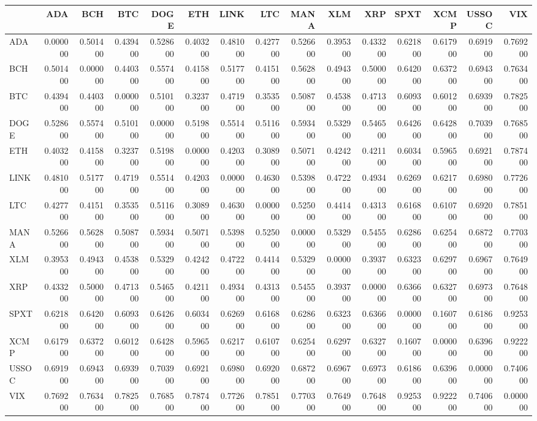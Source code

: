 \begin{tabular}{lrrrrrrrrrrrrrr}
\toprule
 & ADA & BCH & BTC & DOGE & ETH & LINK & LTC & MANA & XLM & XRP & SPXT & XCMP & USSOC & VIX \\
\midrule
ADA & 0.000000 & 0.501400 & 0.439400 & 0.528600 & 0.403200 & 0.481000 & 0.427700 & 0.526600 & 0.395300 & 0.433200 & 0.621800 & 0.617900 & 0.691900 & 0.769200 \\
BCH & 0.501400 & 0.000000 & 0.440300 & 0.557400 & 0.415800 & 0.517700 & 0.415100 & 0.562800 & 0.494300 & 0.500000 & 0.642000 & 0.637200 & 0.694300 & 0.763400 \\
BTC & 0.439400 & 0.440300 & 0.000000 & 0.510100 & 0.323700 & 0.471900 & 0.353500 & 0.508700 & 0.453800 & 0.471300 & 0.609300 & 0.601200 & 0.693900 & 0.782500 \\
DOGE & 0.528600 & 0.557400 & 0.510100 & 0.000000 & 0.519800 & 0.551400 & 0.511600 & 0.593400 & 0.532900 & 0.546500 & 0.642600 & 0.642800 & 0.703900 & 0.768500 \\
ETH & 0.403200 & 0.415800 & 0.323700 & 0.519800 & 0.000000 & 0.420300 & 0.308900 & 0.507100 & 0.424200 & 0.421100 & 0.603400 & 0.596500 & 0.692100 & 0.787400 \\
LINK & 0.481000 & 0.517700 & 0.471900 & 0.551400 & 0.420300 & 0.000000 & 0.463000 & 0.539800 & 0.472200 & 0.493400 & 0.626900 & 0.621700 & 0.698000 & 0.772600 \\
LTC & 0.427700 & 0.415100 & 0.353500 & 0.511600 & 0.308900 & 0.463000 & 0.000000 & 0.525000 & 0.441400 & 0.431300 & 0.616800 & 0.610700 & 0.692000 & 0.785100 \\
MANA & 0.526600 & 0.562800 & 0.508700 & 0.593400 & 0.507100 & 0.539800 & 0.525000 & 0.000000 & 0.532900 & 0.545500 & 0.628600 & 0.625400 & 0.687200 & 0.770300 \\
XLM & 0.395300 & 0.494300 & 0.453800 & 0.532900 & 0.424200 & 0.472200 & 0.441400 & 0.532900 & 0.000000 & 0.393700 & 0.632300 & 0.629700 & 0.696700 & 0.764900 \\
XRP & 0.433200 & 0.500000 & 0.471300 & 0.546500 & 0.421100 & 0.493400 & 0.431300 & 0.545500 & 0.393700 & 0.000000 & 0.636600 & 0.632700 & 0.697300 & 0.764800 \\
SPXT & 0.621800 & 0.642000 & 0.609300 & 0.642600 & 0.603400 & 0.626900 & 0.616800 & 0.628600 & 0.632300 & 0.636600 & 0.000000 & 0.160700 & 0.618600 & 0.925300 \\
XCMP & 0.617900 & 0.637200 & 0.601200 & 0.642800 & 0.596500 & 0.621700 & 0.610700 & 0.625400 & 0.629700 & 0.632700 & 0.160700 & 0.000000 & 0.639600 & 0.922200 \\
USSOC & 0.691900 & 0.694300 & 0.693900 & 0.703900 & 0.692100 & 0.698000 & 0.692000 & 0.687200 & 0.696700 & 0.697300 & 0.618600 & 0.639600 & 0.000000 & 0.740600 \\
VIX & 0.769200 & 0.763400 & 0.782500 & 0.768500 & 0.787400 & 0.772600 & 0.785100 & 0.770300 & 0.764900 & 0.764800 & 0.925300 & 0.922200 & 0.740600 & 0.000000 \\
\bottomrule
\end{tabular}
